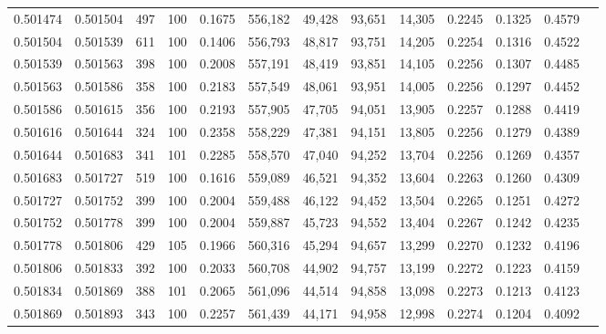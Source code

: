 \begin{tabular}{rrrrrrrrrrrrr}
0.501474 & 0.501504 &   497 & 100 &                                     0.1675 & 556,182 &  49,428 &  93,651 &  14,305 & 0.2245 & 0.1325 & 0.4579 \\
0.501504 & 0.501539 &   611 & 100 &                                     0.1406 & 556,793 &  48,817 &  93,751 &  14,205 & 0.2254 & 0.1316 & 0.4522 \\
0.501539 & 0.501563 &   398 & 100 &                                     0.2008 & 557,191 &  48,419 &  93,851 &  14,105 & 0.2256 & 0.1307 & 0.4485 \\
0.501563 & 0.501586 &   358 & 100 &                                     0.2183 & 557,549 &  48,061 &  93,951 &  14,005 & 0.2256 & 0.1297 & 0.4452 \\
0.501586 & 0.501615 &   356 & 100 &                                     0.2193 & 557,905 &  47,705 &  94,051 &  13,905 & 0.2257 & 0.1288 & 0.4419 \\
0.501616 & 0.501644 &   324 & 100 &                                     0.2358 & 558,229 &  47,381 &  94,151 &  13,805 & 0.2256 & 0.1279 & 0.4389 \\
0.501644 & 0.501683 &   341 & 101 &                                     0.2285 & 558,570 &  47,040 &  94,252 &  13,704 & 0.2256 & 0.1269 & 0.4357 \\
0.501683 & 0.501727 &   519 & 100 &                                     0.1616 & 559,089 &  46,521 &  94,352 &  13,604 & 0.2263 & 0.1260 & 0.4309 \\
0.501727 & 0.501752 &   399 & 100 &                                     0.2004 & 559,488 &  46,122 &  94,452 &  13,504 & 0.2265 & 0.1251 & 0.4272 \\
0.501752 & 0.501778 &   399 & 100 &                                     0.2004 & 559,887 &  45,723 &  94,552 &  13,404 & 0.2267 & 0.1242 & 0.4235 \\
0.501778 & 0.501806 &   429 & 105 &                                     0.1966 & 560,316 &  45,294 &  94,657 &  13,299 & 0.2270 & 0.1232 & 0.4196 \\
0.501806 & 0.501833 &   392 & 100 &                                     0.2033 & 560,708 &  44,902 &  94,757 &  13,199 & 0.2272 & 0.1223 & 0.4159 \\
0.501834 & 0.501869 &   388 & 101 &                                     0.2065 & 561,096 &  44,514 &  94,858 &  13,098 & 0.2273 & 0.1213 & 0.4123 \\
0.501869 & 0.501893 &   343 & 100 &                                     0.2257 & 561,439 &  44,171 &  94,958 &  12,998 & 0.2274 & 0.1204 & 0.4092 \\

\end{tabular}
